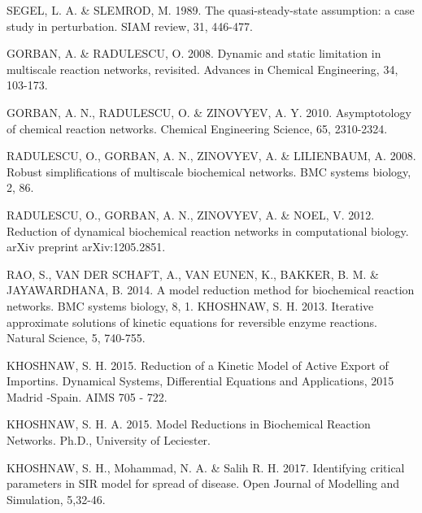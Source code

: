 \documentclass[a4paper,12pt]{article}
\begin{document}
\begin{thebibliography}{1}
  SEGEL, L. A. \& SLEMROD, M. 1989. The quasi-steady-state assumption: a case study in perturbation. SIAM review, 31, 446-477.

 GORBAN, A. \& RADULESCU, O. 2008. Dynamic and static limitation in multiscale reaction networks, revisited. Advances in Chemical Engineering, 34, 103-173.  

 GORBAN, A. N., RADULESCU, O. \& ZINOVYEV, A. Y. 2010. Asymptotology of chemical reaction networks. Chemical Engineering Science, 65, 2310-2324. 

  RADULESCU, O., GORBAN, A. N., ZINOVYEV, A. \& LILIENBAUM, A. 2008. Robust simplifications of multiscale biochemical networks. BMC systems biology, 2, 86. 

  RADULESCU, O., GORBAN, A. N., ZINOVYEV, A. \& NOEL, V. 2012. Reduction of dynamical biochemical reaction networks in computational biology. arXiv preprint arXiv:1205.2851.

  RAO, S., VAN DER SCHAFT, A., VAN EUNEN, K., BAKKER, B. M. \& JAYAWARDHANA, B. 2014. A model reduction method for biochemical reaction networks. BMC systems biology, 8, 1.
 KHOSHNAW, S. H. 2013. Iterative approximate solutions of kinetic equations for reversible enzyme reactions. Natural Science, 5, 740-755.

 KHOSHNAW, S. H. 2015.  Reduction of a Kinetic Model of Active Export of Importins. Dynamical Systems, Differential Equations and Applications, 2015 Madrid -Spain. AIMS  705 - 722.

  KHOSHNAW, S. H. A. 2015. Model Reductions in Biochemical Reaction Networks. Ph.D., University of Leciester.  

 KHOSHNAW, S. H., Mohammad, N. A. \& Salih R. H. 2017. Identifying critical parameters in SIR model for spread of disease. Open Journal of Modelling and Simulation, 5,32-46.

\end{thebibliography}
\end{document}
